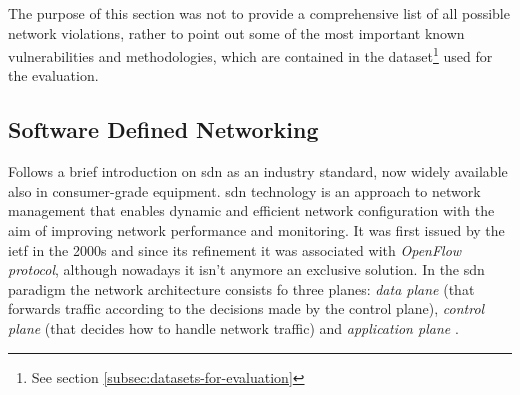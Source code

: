 The purpose of this section was not to provide a comprehensive list of all possible network violations, rather to point out some of the most important known vulnerabilities and methodologies, which are contained in the dataset\footnote{See section \ref{subsec:datasets-for-evaluation}} used for the evaluation.


\subsection{Software Defined Networking}
\label{subsec:sdn}

Follows a brief introduction on \gls{sdn} as an industry standard, now widely available also in consumer-grade equipment. \gls{sdn} technology is an approach to network management that enables dynamic and efficient network configuration with the aim of improving network performance and monitoring. It was first issued by the \gls{ietf} in the 2000s and since its refinement it was associated with \textit{OpenFlow protocol}, although nowadays it isn't anymore an exclusive solution. In the \gls{sdn} paradigm the network architecture consists fo three planes: \textit{data plane} (that forwards traffic according to the decisions made by the control plane), \textit{control plane} (that decides how to handle network traffic) and \textit{application plane} \cite{Kreutz2015}.

